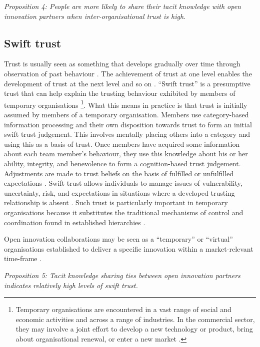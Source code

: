 \emph{Proposition 4: People are more likely to share their tacit knowledge with open innovation partners when inter-organisational trust is high}.

\subsection{Swift trust}

Trust is usually seen as something that develops gradually over time through observation of past behaviour \citep{mayer1995integrative}. The achievement of trust at one level enables the development of trust at the next level and so on \citep{robert2009individual}. \enquote{Swift trust} is a presumptive trust that can help explain the trusting behaviour exhibited by members of temporary organisations \footnote{Temporary organisations are encountered in a vast range of social and economic activities and across a range of industries. In the commercial sector, they may involve a joint effort to develop a new technology or product, bring about organisational renewal, or enter a new market \citep{janowicz2009research}.}. What this means in practice is that trust is initially assumed by members of a temporary organisation. Members use category-based information processing and their own disposition towards trust to form an initial swift trust judgement. This involves mentally placing others into a category and using this as a basis of trust. Once members have acquired some information about each team member’s behaviour, they use this knowledge about his or her ability, integrity, and benevolence to form a cognition-based trust judgement. Adjustments are made to trust beliefs on the basis of fulfilled or unfulfilled expectations \citep{meyerson1996swift,robert2009individual}. Swift trust allows individuals to manage issues of vulnerability, uncertainty, risk, and expectations in situations where a developed trusting relationship is absent \citep{robert2009individual}. Such trust is particularly important in temporary organisations because it substitutes the traditional mechanisms of control and coordination found in established hierarchies \citep{kasper2001communicating}. \medskip

Open innovation collaborations may be seen as a \enquote{temporary} or \enquote{virtual} organisations established to deliver a specific innovation within a market-relevant time-frame \citep{cococcioni2014exploring}. 

\emph{Proposition 5: Tacit knowledge sharing ties between open innovation partners indicates relatively high levels of swift trust.}  

